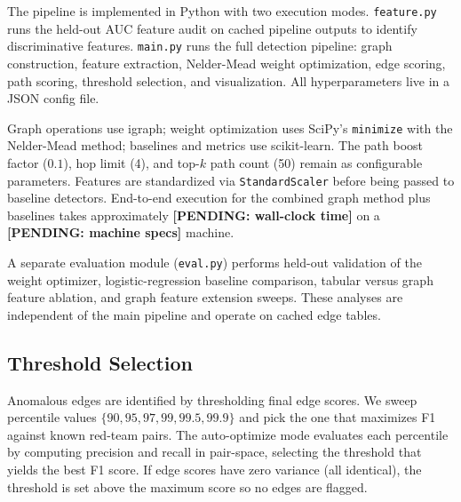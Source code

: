 The pipeline is implemented in Python with two execution modes. \texttt{feature.py} runs the held-out AUC feature audit on cached pipeline outputs to identify discriminative features. \texttt{main.py} runs the full detection pipeline: graph construction, feature extraction, Nelder-Mead weight optimization, edge scoring, path scoring, threshold selection, and visualization. All hyperparameters live in a JSON config file.

Graph operations use igraph; weight optimization uses SciPy's \texttt{minimize} with the Nelder-Mead method; baselines and metrics use scikit-learn. The path boost factor ($0.1$), hop limit (4), and top-$k$ path count (50) remain as configurable parameters. Features are standardized via \texttt{StandardScaler} before being passed to baseline detectors. End-to-end execution for the combined graph method plus baselines takes approximately \textbf{[PENDING: wall-clock time]} on a \textbf{[PENDING: machine specs]} machine.

A separate evaluation module (\texttt{eval.py}) performs held-out validation of the weight optimizer, logistic-regression baseline comparison, tabular versus graph feature ablation, and graph feature extension sweeps. These analyses are independent of the main pipeline and operate on cached edge tables.


\subsection{Threshold Selection}

Anomalous edges are identified by thresholding final edge scores. We sweep percentile values $\{90, 95, 97, 99, 99.5, 99.9\}$ and pick the one that maximizes F1 against known red-team pairs. The auto-optimize mode evaluates each percentile by computing precision and recall in pair-space, selecting the threshold that yields the best F1 score. If edge scores have zero variance (all identical), the threshold is set above the maximum score so no edges are flagged.


